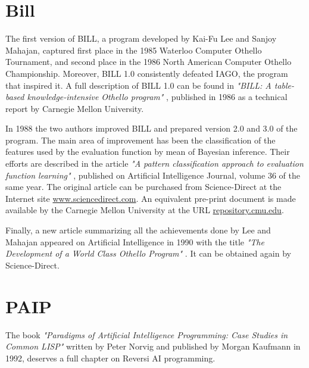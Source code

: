 \documentclass[twoside, 3p, times, a4paper, 11pt, onecolumn]{elsarticle}
\begin{document}
\section{Bill}\label{sec:bill}
The first version of BILL, a program developed by Kai-Fu Lee and Sanjoy Mahajan,
captured first place in the 1985 Waterloo Computer Othello Tournament,
and second place in the 1986 North American Computer Othello Championship.
Moreover, BILL 1.0 consistently defeated IAGO, the program that inspired it.
A full description of BILL 1.0 can be found in {\it "BILL: A table-based knowledge-intensive Othello program"} \cite{Lee1986},
published in 1986 as a technical report by Carnegie Mellon University.

In 1988 the two authors improved BILL and prepared version 2.0 and 3.0 of the program. The main area of improvement has been
the classification of the features used by the evaluation function by mean of Bayesian inference. Their efforts are described
in the article {\it "A pattern classification approach to evaluation function learning"} \cite{Lee1988}, published on Artificial
Intelligence Journal, volume 36 of the same year. The original article can be purchased from Science-Direct at the Internet site
\url{www.sciencedirect.com}. An equivalent pre-print document is made available by the Carnegie Mellon University at the
URL \url{repository.cmu.edu}. 

Finally, a new article summarizing all the achievements done by Lee and Mahajan appeared on Artificial Intelligence in 1990 with
the title {\it "The Development of a World Class Othello Program"} \cite{Lee1990}. It can be obtained again by Science-Direct. 


\section{PAIP}\label{sec:paip}
The book {\it "Paradigms of Artificial Intelligence Programming: Case Studies in Common LISP"} \cite{Norvig1992} written by Peter Norvig
and published by Morgan Kaufmann in 1992, deserves a full chapter on Reversi AI programming.


%

\end{document}
